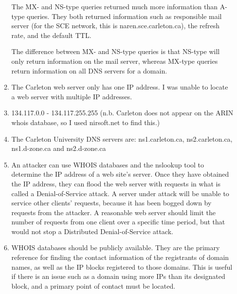 \documentclass{article}
\begin{document}
\begin{enumerate}
\begin{enumerate}
The MX- and NS-type queries returned much more information than A-type queries. They both returned information such as responsible mail server (for the SCE network, this is naren.sce.carleton.ca), the refresh rate, and the default TTL.

The difference between MX- and NS-type queries is that NS-type will only return information on the mail server, whereas MX-type queries return information on all DNS servers for a domain.

\item The Carleton web server only has one IP address. I was unable to locate a web server with multiple IP addresses.

\item 134.117.0.0 - 134.117.255.255 (n.b. Carleton does not appear on the ARIN whois database, so I used nirsoft.net to find this.)

\item The Carleton University DNS servers are: ns1.carleton.ca, ns2.carleton.ca, ns1.d-zone.ca and ns2.d-zone.ca

\item An attacker can use WHOIS databases and the nslookup tool to determine the IP address of a web site's server. Once they have obtained the IP address, they can flood the web server with requests in what is called a Denial-of-Service attack. A server under attack will be unable to service other clients' requests, because it has been bogged down by requests from the attacker. A reasonable web server should limit the number of requests from one client over a specific time period, but that would not stop a Distributed Denial-of-Service attack.

\item WHOIS databases should be publicly available. They are the primary reference for finding the contact information of the registrants of domain names, as well as the IP blocks registered to those domains. This is useful if there is an issue such as a domain using more IPs than its designated block, and a primary point of contact must be located.

\end{enumerate}

\end{enumerate}
\end{document}
